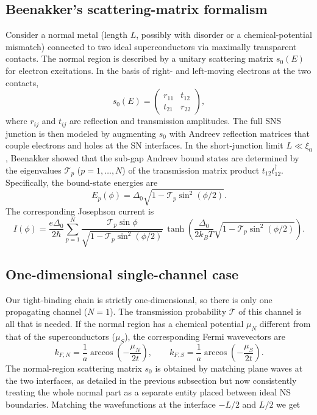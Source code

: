 \documentclass[11pt,a4paper,twoside,openany]{report}
\begin{document}
\subsection{Beenakker’s scattering-matrix formalism}

Consider a normal metal (length $L$, possibly with disorder or a chemical-potential mismatch) connected to two ideal superconductors via maximally transparent contacts. The normal region is described by a unitary scattering matrix $s_0(E)$ for electron excitations. In the basis of right- and left-moving electrons at the two contacts,
\begin{equation}
  s_0(E) = \begin{pmatrix}
    r_{11} & t_{12} \\
    t_{21} & r_{22}
  \end{pmatrix},
  \label{eq:s0}
\end{equation}
where $r_{ij}$ and $t_{ij}$ are reflection and transmission amplitudes.  The full SNS
junction is then modeled by augmenting $s_0$ with Andreev reflection matrices that couple
electrons and holes at the SN interfaces.  In the short-junction limit $L\ll\xi_0$,
Beenakker showed that the sub-gap Andreev bound states are determined by the eigenvalues
$\mathcal{T}_p$ ($p=1,\dots,N$) of the transmission matrix product $t_{12}t_{12}^\dagger$.
Specifically, the bound-state energies are
\begin{equation}
  E_p(\phi) = \Delta_0 \sqrt{1 - \mathcal{T}_p \sin^2(\phi/2)} .
  \label{eq:Beenakker_ABS}
\end{equation}
The corresponding Josephson current is
\begin{equation}
  I(\phi) = \frac{e\Delta_0}{2\hbar} \sum_{p=1}^N
            \frac{\mathcal{T}_p \sin\phi}{\sqrt{1 - \mathcal{T}_p \sin^2(\phi/2)}} \,
            \tanh\!\left( \frac{\Delta_0}{2k_B T} \sqrt{1 - \mathcal{T}_p \sin^2(\phi/2)} \right).
  \label{eq:Beenakker_current_general}
\end{equation}

\subsection{One-dimensional single-channel case}

Our tight-binding chain is strictly one-dimensional, so there is only one propagating channel ($N=1$).  The transmission probability $\mathcal{T}$ of this channel is all that is needed. If the normal region has a chemical potential $\mu_N$ different from that of the superconductors ($\mu_S$), the corresponding Fermi wavevectors are
\begin{equation}
  k_{F,N} = \frac{1}{a}\arccos\!\left(-\frac{\mu_N}{2t}\right), \qquad
  k_{F,S} = \frac{1}{a}\arccos\!\left(-\frac{\mu_S}{2t}\right).
  \label{eq:mu}
\end{equation}
The normal-region scattering matrix $s_0$ is obtained by matching plane waves at the two
interfaces, as detailed in the previous subsection but now consistently treating the whole
normal part as a separate entity placed between ideal NS boundaries. Matching the wavefunctions at the interface \(-L/2\) and \(L/2\) we get
\end{document}
